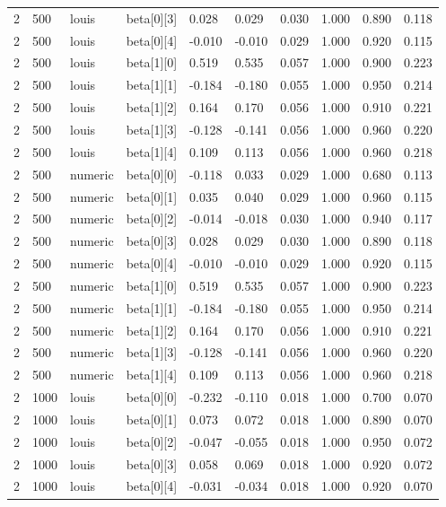 \begin{table}
\begin{tabular}{llllllllll}
2 & 500 & louis & beta[0][3] & 0.028 & 0.029 & 0.030 & 1.000 & 0.890 & 0.118 \\
2 & 500 & louis & beta[0][4] & -0.010 & -0.010 & 0.029 & 1.000 & 0.920 & 0.115 \\
2 & 500 & louis & beta[1][0] & 0.519 & 0.535 & 0.057 & 1.000 & 0.900 & 0.223 \\
2 & 500 & louis & beta[1][1] & -0.184 & -0.180 & 0.055 & 1.000 & 0.950 & 0.214 \\
2 & 500 & louis & beta[1][2] & 0.164 & 0.170 & 0.056 & 1.000 & 0.910 & 0.221 \\
2 & 500 & louis & beta[1][3] & -0.128 & -0.141 & 0.056 & 1.000 & 0.960 & 0.220 \\
2 & 500 & louis & beta[1][4] & 0.109 & 0.113 & 0.056 & 1.000 & 0.960 & 0.218 \\
2 & 500 & numeric & beta[0][0] & -0.118 & 0.033 & 0.029 & 1.000 & 0.680 & 0.113 \\
2 & 500 & numeric & beta[0][1] & 0.035 & 0.040 & 0.029 & 1.000 & 0.960 & 0.115 \\
2 & 500 & numeric & beta[0][2] & -0.014 & -0.018 & 0.030 & 1.000 & 0.940 & 0.117 \\
2 & 500 & numeric & beta[0][3] & 0.028 & 0.029 & 0.030 & 1.000 & 0.890 & 0.118 \\
2 & 500 & numeric & beta[0][4] & -0.010 & -0.010 & 0.029 & 1.000 & 0.920 & 0.115 \\
2 & 500 & numeric & beta[1][0] & 0.519 & 0.535 & 0.057 & 1.000 & 0.900 & 0.223 \\
2 & 500 & numeric & beta[1][1] & -0.184 & -0.180 & 0.055 & 1.000 & 0.950 & 0.214 \\
2 & 500 & numeric & beta[1][2] & 0.164 & 0.170 & 0.056 & 1.000 & 0.910 & 0.221 \\
2 & 500 & numeric & beta[1][3] & -0.128 & -0.141 & 0.056 & 1.000 & 0.960 & 0.220 \\
2 & 500 & numeric & beta[1][4] & 0.109 & 0.113 & 0.056 & 1.000 & 0.960 & 0.218 \\
2 & 1000 & louis & beta[0][0] & -0.232 & -0.110 & 0.018 & 1.000 & 0.700 & 0.070 \\
2 & 1000 & louis & beta[0][1] & 0.073 & 0.072 & 0.018 & 1.000 & 0.890 & 0.070 \\
2 & 1000 & louis & beta[0][2] & -0.047 & -0.055 & 0.018 & 1.000 & 0.950 & 0.072 \\
2 & 1000 & louis & beta[0][3] & 0.058 & 0.069 & 0.018 & 1.000 & 0.920 & 0.072 \\
2 & 1000 & louis & beta[0][4] & -0.031 & -0.034 & 0.018 & 1.000 & 0.920 & 0.070 \\

\end{tabular}
\end{table}
